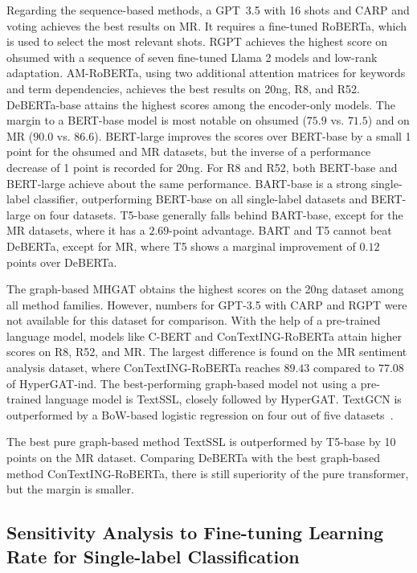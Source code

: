 \documentclass[lettersize,journal]{IEEEtran}
\begin{document}
Regarding the sequence-based methods, a GPT~3.5 with 16 shots and CARP and voting achieves the best results on MR.
It requires a fine-tuned RoBERTa, which is used to select the most relevant shots.
RGPT achieves the highest score on ohsumed with a sequence of seven fine-tuned Llama 2 models and low-rank adaptation.
AM-RoBERTa, using two additional attention matrices for keywords and term dependencies, achieves the best results on 20ng, R8, and R52. 
DeBERTa-base attains the highest scores among the encoder-only models. 
The margin to a BERT-base model is most notable on ohsumed ($75.9$ vs. $71.5$) and on MR ($90.0$ vs. $86.6$).
 BERT-large improves the scores over BERT-base by a small 1 point for the ohsumed and MR datasets, but the inverse of a performance decrease of 1 point is recorded for 20ng. 
For R8 and R52, both BERT-base and BERT-large achieve about the same performance. 
BART-base is a strong single-label classifier, outperforming BERT-base on all single-label datasets and BERT-large on four datasets. 
T5-base generally falls behind BART-base, except for the MR datasets, where it has a $2.69$-point advantage. 
BART and T5 cannot beat DeBERTa, except for MR, where T5 shows a marginal improvement of $0.12$ points over DeBERTa.

The graph-based MHGAT obtains the highest scores on the 20ng dataset among all method families.
However, numbers for GPT-3.5 with CARP and RGPT were not available for this dataset for comparison.
With the help of a pre-trained language model, models like C-BERT and ConTextING-RoBERTa attain higher scores on R8, R52, and MR.
The largest difference is found on the MR sentiment analysis dataset, where ConTextING-RoBERTa reaches $89.43$ compared to $77.08$ of HyperGAT-ind.
The best-performing graph-based model not using a pre-trained language model is TextSSL, closely followed by HyperGAT.
TextGCN is outperformed by a BoW-based logistic regression on four out of five datasets~\cite{DBLP:conf/wsdm/RageshSIBL21}.

The best pure graph-based method TextSSL is outperformed by T5-base by 10 points on the MR dataset.
Comparing DeBERTa with the best graph-based method ConTextING-RoBERTa, there is still superiority of the pure transformer, but the margin is smaller.

\subsection{Sensitivity Analysis to Fine-tuning Learning Rate for Single-label Classification}
\end{document}
